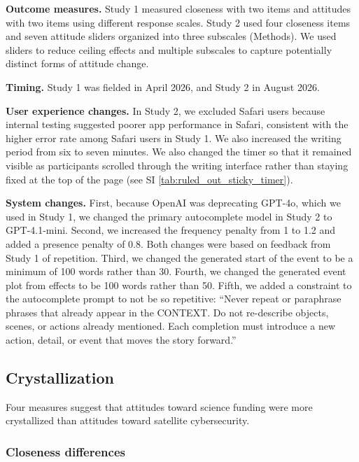 \documentclass[11pt]{article}
\begin{document}
\textbf{Outcome measures.} Study 1 measured closeness with two items and attitudes with two items using different response scales. Study 2 used four closeness items and seven attitude sliders organized into three subscales (Methods). We used sliders to reduce ceiling effects and multiple subscales to capture potentially distinct forms of attitude change.

\textbf{Timing.} Study 1 was fielded in April 2026, and Study 2 in August 2026.

\textbf{User experience changes.} In Study 2, we excluded Safari users because internal testing suggested poorer app performance in Safari, consistent with the higher error rate among Safari users in Study 1. We also increased the writing period from six to seven minutes. We also changed the timer so that it remained visible as participants scrolled through the writing interface rather than staying fixed at the top of the page (see SI \autoref{tab:ruled_out_sticky_timer}).

\textbf{System changes.} First, because OpenAI was deprecating GPT-4o, which we used in Study 1, we changed the primary autocomplete model in Study 2 to GPT-4.1-mini. Second, we increased the frequency penalty from 1 to 1.2 and added a presence penalty of 0.8. Both changes were based on feedback from Study 1 of repetition. Third, we changed the generated start of the event to be a minimum of 100 words rather than 30. Fourth, we changed the generated event plot from effects to be 100 words rather than 50. Fifth, we added a constraint to the autocomplete prompt to not be so repetitive: ``Never repeat or paraphrase phrases that already appear in the CONTEXT. Do not re-describe objects, scenes, or actions already mentioned. Each completion must introduce a new action, detail, or event that moves the story forward.''


\subsection{Crystallization}
\label{sec:si-crystallization}

Four measures suggest that attitudes toward science funding were more crystallized than attitudes toward satellite cybersecurity.

\subsubsection{Closeness differences}
\label{sec:si-closeness-differences}
\end{document}
